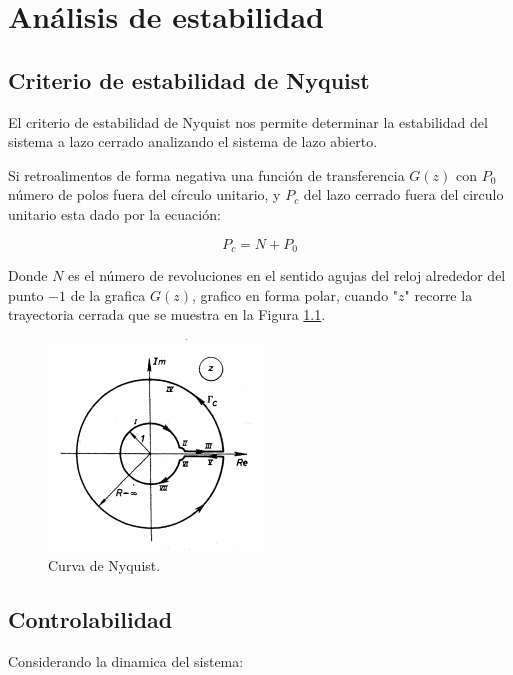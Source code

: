 \chapter{Análisis de estabilidad}



\section{Criterio de estabilidad de Nyquist}

El criterio de estabilidad de Nyquist nos permite determinar la estabilidad del sistema 
a lazo cerrado analizando el sistema de lazo abierto. 


Si retroalimentos de forma negativa una función de transferencia $G(z)$ con $P_0$ número de polos fuera del círculo unitario,
y $P_c$ del lazo cerrado fuera del circulo unitario esta dado por la ecuación: 

\begin{equation}
    P_c = N + P_0
\end{equation}

Donde $N$ es el número de revoluciones en el sentido agujas del reloj alrededor del punto $-1$ de la grafica $G(z)$, grafico en forma polar, 
cuando "$z$" recorre la trayectoria cerrada que se muestra en la Figura \ref{fig:nyquist}. 

\begin{figure}
    \centering
    \includegraphics[width=.5\textwidth]{img/nyquist.png}
    \caption{Curva de Nyquist.}
    \label{fig:nyquist}
\end{figure}

\section{Controlabilidad}

Considerando la dinamica del sistema: 

